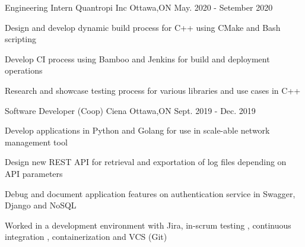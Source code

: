 

\begin{cventries}
  \cventry
    {Engineering Intern} %
    {Quantropi Inc } %
    {Ottawa,ON} %
    {May. 2020 - Setember 2020} %
    {
      \begin{cvitems} %
      \item { Design and develop dynamic build process for C\C++ using CMake and Bash scripting }
      \item { Develop CI process using Bamboo and Jenkins for build and deployment operations }
      \item { Research and showcase testing process for various libraries and use cases in C++ }
      \end{cvitems}
    }
  \cventry
    {Software Developer (Coop)} %
    {Ciena} %
    {Ottawa,ON} %
    {Sept. 2019 - Dec. 2019} %
    {
      \begin{cvitems} %
      \item { Develop applications in Python and Golang for use in scale-able network management tool}
      \item { Design new REST API for retrieval and exportation of log files depending on API parameters}
      \item { Debug and document application features on authentication service in Swagger, Django and NoSQL }
      \item { Worked in a development environment with Jira,  in-scrum testing , continuous integration , containerization and VCS (Git)  } 
      \end{cvitems}
    }




\end{cventries}

